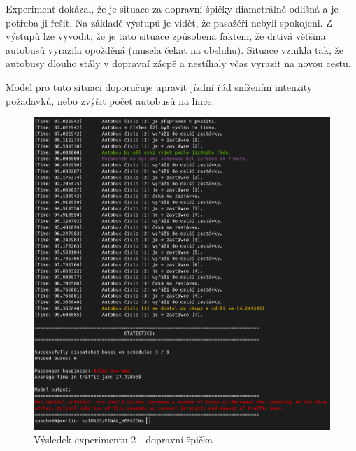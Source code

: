 \documentclass[a4paper]{article}
\begin{document}
                \begin{table}[H]
                    \centering
                    \caption{Parametry experimentu 2}
                    \label{tab:experiment2}
                \end{table}

				Experiment dokázal, že je situace za dopravní špičky diametrálně odlišná a je potřeba ji řešit. Na základě výstupů je vidět, že pasažéři nebyli spokojeni. Z výstupů lze vyvodit, že je tato situace způsobena faktem, že drtivá většina autobusů vyrazila opožděná (musela čekat na obsluhu). Situace vznikla tak, že autobusy dlouho stály v dopravní zácpě a nestíhaly včas vyrazit na novou cestu.
                
                Model pro tuto situaci doporučuje upravit jízdní řád snížením intenzity požadavků, nebo zvýšit počet autobusů na lince.

                \begin{figure}[H]
                \includegraphics[scale=0.48, keepaspectratio]{fig/ims_bus2.png}
                \caption{Výsledek experimentu 2 - dopravní špička}
                \label{fig:experiment2}
            \end{figure}
    \newpage
\end{document}
